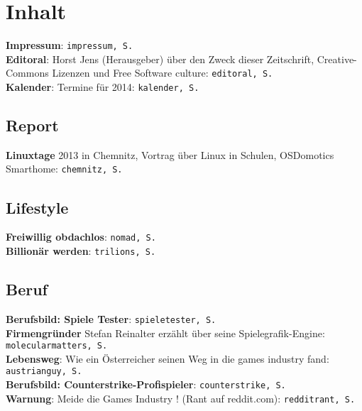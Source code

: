 \section*{Inhalt} 
\label{inhalt}

\textbf{Impressum}: \texttt{impressum, S. \pageref{impressum}}\\
\textbf{Editoral}: Horst Jens (Herausgeber) über den Zweck dieser Zeitschrift, Creative-Commons Lizenzen und Free Software culture: \texttt{editoral, S. \pageref{editoral}}\\ 
\textbf{Kalender}: Termine für 2014: \texttt{kalender, S. \pageref{kalender}}

\subsection*{Report}

\textbf{Linuxtage} 2013 in Chemnitz, Vortrag über Linux in Schulen, OSDomotics Smarthome: \texttt{chemnitz, S. \pageref{chemnitz}}\\

\subsection*{Lifestyle}

\textbf{Freiwillig obdachlos}: \texttt{nomad, S. \pageref{nomad}}\\
\textbf{Billionär werden}: \texttt{trilions, S. \pageref{trillions}}\\

\subsection*{Beruf}

\textbf{Berufsbild: Spiele Tester}: \texttt{spieletester, S. \pageref{spieletester}}\\
\textbf{Firmengründer} Stefan Reinalter erzählt über seine Spielegrafik-Engine: \texttt{molecularmatters, S. \pageref{molecularmatters}}\\
\textbf{Lebensweg}: Wie ein Österreicher seinen Weg in die games industry fand: \texttt{austrianguy, S. \pageref{austrianguy}}\\
\textbf{Berufsbild: Counterstrike-Profispieler}: \texttt{counterstrike, S. \pageref{counterstrike}}\\
\textbf{Warnung}: Meide die Games Industry ! (Rant auf reddit.com): \texttt{redditrant, S. \pageref{redditrant}}\\

